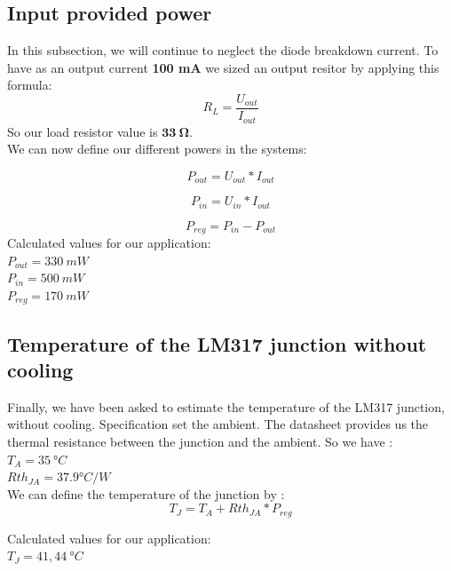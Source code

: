 \subsection{Input provided power} \label{ssec:num03}
{
In this subsection, we will continue to neglect the diode breakdown current. To have as an output current \textbf{100 mA} we sized an output resitor by applying this formula:
\begin{equation}
    R_L = \frac{U_{out}}{I_{out}}
\end{equation}
So our load resistor value is $ \mathbf{ 33 \ \boldsymbol{\Omega} } $. \\
\clearpage
We can now define our different powers in the systems:

\begin{equation}
    P_{out} = U_{out}*I_{out}
\end{equation}

\begin{equation}
    P_{in} = U_{in}*I_{out}
\end{equation}

\begin{equation}
    P_{reg} = P_{in} - P_{out}
\end{equation}
Calculated values for our application:\\
$ P_{out} = 330 \ mW $ \\
$ P_{in}  = 500 \ mW $ \\
$ P_{reg} = 170 \ mW $ \\
}

\subsection{Temperature of the LM317 junction without cooling} \label{ssec:num05}
{
Finally, we have been asked to estimate the temperature of the LM317 junction, without cooling. Specification set the ambient. The datasheet provides us the thermal resistance between the junction and the ambient. So we have : \\
$ T_{A} = 35 \ °C $ \\
$ Rth_{JA} = 37.9 °C/W $\\
We can define the temperature of the junction by :
\begin{equation*}
	T_{J} = T_{A} + Rth_{JA} * P_{reg}
\end{equation*}

Calculated values for our application:\\
$ T_{J} = 41,44 \ °C $ \\

}

